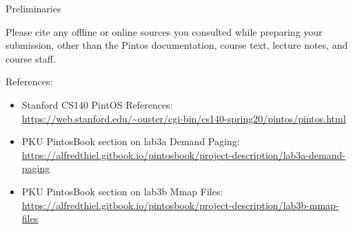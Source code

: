 \begin{titlepage}
\begin{aspect}{Preliminaries}
\begin{tcolorbox}
			Please cite any offline or online sources you consulted while
			preparing your submission, other than the Pintos documentation, course
			text, lecture notes, and course staff.
		\end{tcolorbox}
		References:
		\begin{itemize}
			\item Stanford CS140 PintOS References: \\
			      \url{https://web.stanford.edu/~ouster/cgi-bin/cs140-spring20/pintos/pintos.html}
			\item PKU PintosBook section on lab3a Demand Paging: \\
			      \url{https://alfredthiel.gitbook.io/pintosbook/project-description/lab3a-demand-paging}
			\item PKU PintosBook section on lab3b Mmap Files: \\
			      \url{https://alfredthiel.gitbook.io/pintosbook/project-description/lab3b-mmap-files}
		\end{itemize}
	\end{aspect}

\end{titlepage}
